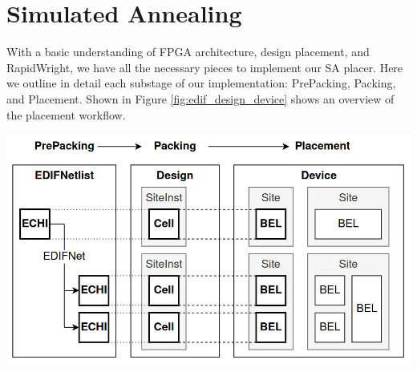 
\section{Simulated Annealing}
\label{sec:simulated_annealing}
With a basic understanding of FPGA architecture, design placement, and RapidWright, we have all the necessary pieces to implement our SA placer. 
Here we outline in detail each substage of our implementation: PrePacking, Packing, and Placement. 
Shown in Figure \ref{fig:edif_design_device} shows an overview of the placement workflow. 

{
    \centering
    \includegraphics[width=0.9\columnwidth]{figures/edif_design_device.png}
    \label{fig:edif_design_device}
}

